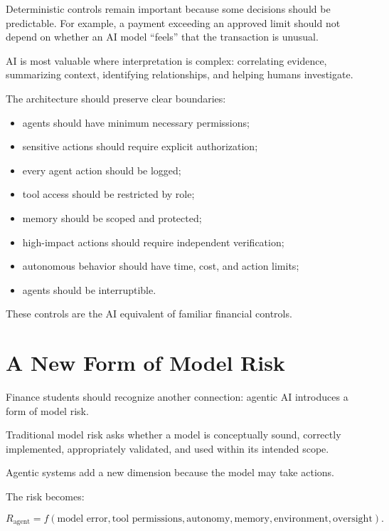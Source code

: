 Deterministic controls remain important because some decisions should be predictable. For example, a payment exceeding an approved limit should not depend on whether an AI model ``feels'' that the transaction is unusual.

AI is most valuable where interpretation is complex: correlating evidence, summarizing context, identifying relationships, and helping humans investigate.

The architecture should preserve clear boundaries:

\begin{itemize}
    \item agents should have minimum necessary permissions;
    \item sensitive actions should require explicit authorization;
    \item every agent action should be logged;
    \item tool access should be restricted by role;
    \item memory should be scoped and protected;
    \item high-impact actions should require independent verification;
    \item autonomous behavior should have time, cost, and action limits;
    \item agents should be interruptible.
\end{itemize}

These controls are the AI equivalent of familiar financial controls.

\section{A New Form of Model Risk}

Finance students should recognize another connection: agentic AI introduces a form of model risk.

Traditional model risk asks whether a model is conceptually sound, correctly implemented, appropriately validated, and used within its intended scope.

Agentic systems add a new dimension because the model may take actions.

The risk becomes:

\begin{equation}
R_{\text{agent}}
=
f(
\text{model error},
\text{tool permissions},
\text{autonomy},
\text{memory},
\text{environment},
\text{oversight}
).
\end{equation}

